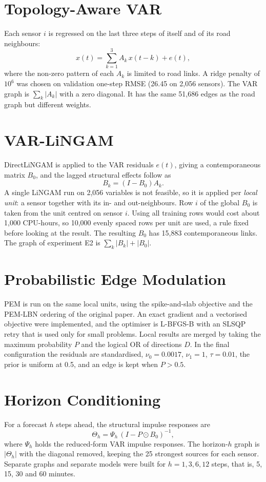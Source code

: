 \documentclass[MTech]{ugthesis}
\begin{document}
\section{Topology-Aware VAR}
Each sensor $i$ is regressed on the last three steps of itself and of its road neighbours:
\begin{equation}
x(t)=\sum_{k=1}^{3} A_k\,x(t-k)+e(t),
\end{equation}
where the non-zero pattern of each $A_k$ is limited to road links. A ridge penalty of $10^{6}$ was chosen on validation one-step RMSE (26.45 on 2,056 sensors). The VAR graph is $\sum_k |A_k|$ with a zero diagonal. It has the same 51,686 edges as the road graph but different weights.

\section{VAR-LiNGAM}
DirectLiNGAM is applied to the VAR residuals $e(t)$, giving a contemporaneous matrix $B_0$, and the lagged structural effects follow as
\begin{equation}
B_k=(I-B_0)A_k .
\end{equation}
A single LiNGAM run on 2,056 variables is not feasible, so it is applied per \emph{local unit}: a sensor together with its in- and out-neighbours. Row $i$ of the global $B_0$ is taken from the unit centred on sensor $i$. Using all training rows would cost about 1,000 CPU-hours, so 10,000 evenly spaced rows per unit are used, a rule fixed before looking at the result. The resulting $B_0$ has 15,883 contemporaneous links. The graph of experiment E2 is $\sum_k|B_k|+|B_0|$.

\section{Probabilistic Edge Modulation}
PEM is run on the same local units, using the spike-and-slab objective and the PEM-LBN ordering of the original paper. An exact gradient and a vectorised objective were implemented, and the optimiser is L-BFGS-B with an SLSQP retry that is used only for small problems. Local results are merged by taking the maximum probability $P$ and the logical OR of directions $D$. In the final configuration the residuals are standardised, $\nu_0=0.0017$, $\nu_1=1$, $\tau=0.01$, the prior is uniform at 0.5, and an edge is kept when $P>0.5$.

\section{Horizon Conditioning}
For a forecast $h$ steps ahead, the structural impulse responses are
\begin{equation}
\Theta_h=\Psi_h\,(I-P\odot B_0)^{-1},
\end{equation}
where $\Psi_h$ holds the reduced-form VAR impulse responses. The horizon-$h$ graph is $|\Theta_h|$ with the diagonal removed, keeping the 25 strongest sources for each sensor. Separate graphs and separate models were built for $h=1,3,6,12$ steps, that is, 5, 15, 30 and 60 minutes.
\end{document}
